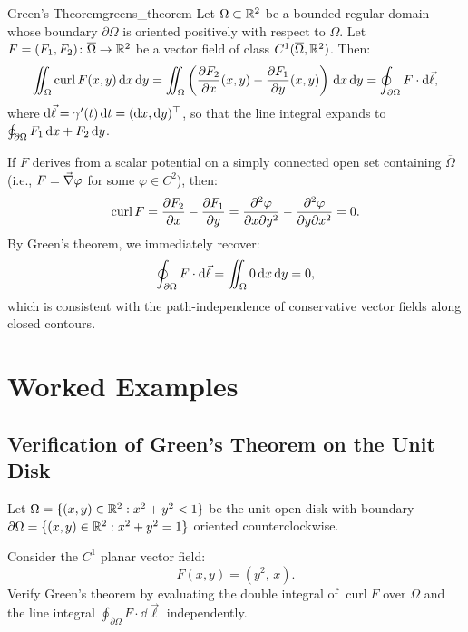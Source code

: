 \begin{theoreme}{Green's Theorem}{greens_theorem}
Let $\Omega \subset \mathbb{R}^2$ be a bounded regular domain whose boundary $\partial\Omega$ is oriented positively with respect to $\Omega$. Let $F = (F_1, F_2) \colon \overline{\Omega} \to \mathbb{R}^2$ be a vector field of class $C^1(\overline{\Omega}, \mathbb{R}^2)$. Then:
\[\iint_{\Omega} \operatorname{curl} F(x, y) \dx\dy = \iint_{\Omega} \left( \pdv{F_2}{x}(x, y) - \pdv{F_1}{y}(x, y) \right) \dx\dy = \oint_{\partial\Omega} F \cdot \dd\vec{\ell},\]
where $\mathrm{d}\vec{\ell} = \gamma'(t) \,\mathrm{d}t = (\mathrm{d} x, \mathrm{d} y)^\top$, so that the line integral expands to $\oint_{\partial\Omega} F_1 \,\mathrm{d}x + F_2 \,\mathrm{d}y$.
\end{theoreme}

\begin{remarque}
If $F$ derives from a scalar potential on a simply connected open set containing $\overline{\Omega}$ (i.e., $F = \vec{\nabla} \varphi$ for some $\varphi \in C^2$), then:
\[\operatorname{curl} F = \pdv{F_2}{x} - \pdv{F_1}{y} = \pdv[2]{\varphi}{x \partial y} - \pdv[2]{\varphi}{y \partial x} = 0.\]
By Green's theorem, we immediately recover:
\[\oint_{\partial\Omega} F \cdot \mathrm{d}\vec{\ell} = \iint_{\Omega} 0 \,\mathrm{d}x\,\mathrm{d}y = 0,\]
which is consistent with the path-independence of conservative vector fields along closed contours.
\end{remarque}

\section{Worked Examples}

\subsection{Verification of Green's Theorem on the Unit Disk}

\begin{exemple}
Let \(\Omega = \{ (x, y) \in \mathbb{R}^2 : x^2 + y^2 < 1 \}\) be the unit open disk with boundary \(\partial\Omega = \{ (x, y) \in \mathbb{R}^2 : x^2 + y^2 = 1 \}\) oriented counterclockwise. 

Consider the \(C^1\) planar vector field:
\[
    F(x, y) = (y^2, \, x).
\]
Verify Green's theorem by evaluating the double integral of \(\operatorname{curl} F\) over \(\Omega\) and the line integral \(\oint_{\partial\Omega} F \cdot \dd\vec{\ell}\) independently.
\end{exemple}


